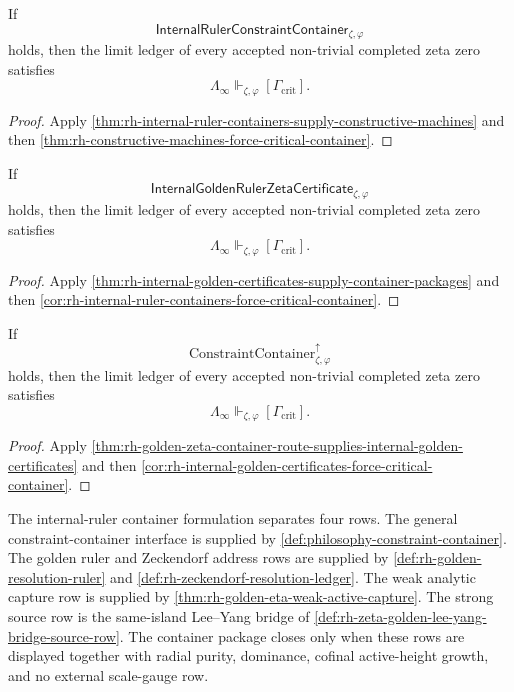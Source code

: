 \begin{corollary}
\label{cor:rh-internal-ruler-containers-force-critical-container}
If
$$
\mathsf{InternalRulerConstraintContainer}_{\zeta,\varphi}
$$
holds, then the limit ledger of every accepted non-trivial completed
zeta zero satisfies
$$
\Lambda_{\infty}
\Vdash_{\zeta,\varphi}
[\Gamma_{\mathrm{crit}}].
$$
\end{corollary}

\begin{proof}
Apply
\autoref{thm:rh-internal-ruler-containers-supply-constructive-machines}
and then
\autoref{thm:rh-constructive-machines-force-critical-container}.
\end{proof}

\begin{corollary}
\label{cor:rh-internal-golden-certificates-force-critical-container}
If
$$
\mathsf{InternalGoldenRulerZetaCertificate}_{\zeta,\varphi}
$$
holds, then the limit ledger of every accepted non-trivial completed
zeta zero satisfies
$$
\Lambda_{\infty}
\Vdash_{\zeta,\varphi}
[\Gamma_{\mathrm{crit}}].
$$
\end{corollary}

\begin{proof}
Apply
\autoref{thm:rh-internal-golden-certificates-supply-container-packages}
and then
\autoref{cor:rh-internal-ruler-containers-force-critical-container}.
\end{proof}

\begin{corollary}
\label{cor:rh-golden-zeta-containers-force-critical-container}
If
$$
\mathrm{ConstraintContainer}^{\uparrow}_{\zeta,\varphi}
$$
holds, then the limit ledger of every accepted non-trivial completed
zeta zero satisfies
$$
\Lambda_{\infty}
\Vdash_{\zeta,\varphi}
[\Gamma_{\mathrm{crit}}].
$$
\end{corollary}

\begin{proof}
Apply
\autoref{thm:rh-golden-zeta-container-route-supplies-internal-golden-certificates}
and then
\autoref{cor:rh-internal-golden-certificates-force-critical-container}.
\end{proof}

\begin{principle}
\label{prin:rh-internal-ruler-container-proof-load}
The internal-ruler container formulation separates four rows.  The
general constraint-container interface is supplied by
\autoref{def:philosophy-constraint-container}.  The golden ruler and
Zeckendorf address rows are supplied by
\autoref{def:rh-golden-resolution-ruler} and
\autoref{def:rh-zeckendorf-resolution-ledger}.  The weak analytic
capture row is supplied by
\autoref{thm:rh-golden-eta-weak-active-capture}.  The strong source row
is the same-island Lee--Yang bridge of
\autoref{def:rh-zeta-golden-lee-yang-bridge-source-row}.  The container
package closes only when these rows are displayed together with radial
purity, dominance, cofinal active-height growth, and no external
scale-gauge row.
\end{principle}

